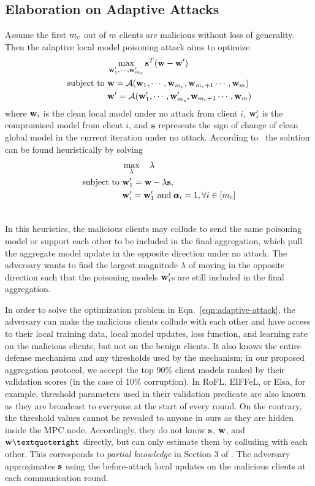 \subsection{Elaboration on Adaptive Attacks}
\label{app:adaptive-attack}
Assume the first $m_c$ out of $m$ clients are malicious without loss of generality. Then the adaptive local model poisoning attack aims to optimize 
\begin{align}    
\label{eqn:adaptive-attack}
&\max_{\mathbf{w}'_1,\cdots,\mathbf{w}'_{m_c}} \mathbf{s}^{T}(\mathbf{w} - \mathbf{w}')\\ \nonumber
\text{subject to} ~&\mathbf{w} = \mathcal{A}(\mathbf{w}_1, \cdots, \mathbf{w}_{m_c}, \mathbf{w}_{m_c+1} \cdots, \mathbf{w}_{m})\\ \nonumber
&\mathbf{w}' = \mathcal{A}(\mathbf{w}'_1, \cdots, \mathbf{w}'_{m_c}, \mathbf{w}_{m_c+1} \cdots, \mathbf{w}_{m})
\end{align}
where $\mathbf{w}_i$ is the clean local model under no attack from client $i$, $\mathbf{w}'_{i}$ is the compromised model from client $i$, and $\mathbf{s}$ represents the sign of change of clean global model in the current iteration under no attack.
According to~\cite{fang2020local} the solution can be found heuristically by solving
\begin{align}
\label{eqn:adaptive-attack-approx}
&\max_{\lambda} \ \ \  \lambda \\ \nonumber
\text{subject to} ~&\mathbf{w}'_1 = \mathbf{w} - \lambda\mathbf{s}, \\ \nonumber
&\mathbf{w}'_i = \mathbf{w}'_1 \mbox{ and } \pmb{\alpha}_i=1, \forall i\in [m_c]\\ \nonumber
\end{align}

In this heuristics, the malicious clients may collude to send the same poisoning model or support each other to be included in the final aggregation, which pull the aggregate model update in the opposite direction under no attack. The adversary wants to find the largest magnitude $\lambda$ of moving in the opposite direction such that the poisoning models $\mathbf{w}'_i$s are still included in the final aggregation.

In order to solve the optimization problem in Eqn.~\ref{eqn:adaptive-attack}, the adversary can make the malicious clients collude with each other and have access to their local training data, local model updates, loss function, and learning rate on the malicious clients, but not on the benign clients.
It also knows the entire defense mechanism and any thresholds used by the mechanism; \ie in our proposed aggregation protocol, we accept the top 90\% client models ranked by their validation scores (in the case of 10\% corruption). 
In RoFL, EIFFeL, or Elsa, for example, threshold parameters used in their validation predicate are also known as they are broadcast to everyone at the start of every round. On the contrary, the threshold values cannot be revealed to anyone in ours as they are hidden inside the MPC node.
Accordingly, they do not know $\mathbf{s}$, $\mathbf{w}$, and $\bfw’$ directly, but can only estimate them by colluding with each other. 
This corresponds to \textit{partial knowledge} in Section 3 of \citet{fang2020local}. The adversary approximates $\mathbf{s}$ using the before-attack local updates on the malicious clients at each communication round.

